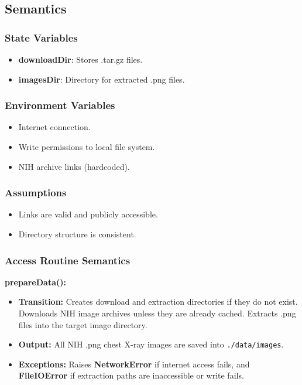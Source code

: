\documentclass[12pt, titlepage]{article}
\begin{document}
\subsection{Semantics}

\subsubsection{State Variables}
\begin{itemize}
    \item \textbf{downloadDir}: Stores .tar.gz files.
    \item \textbf{imagesDir}: Directory for extracted .png files.
\end{itemize}

\subsubsection{Environment Variables}
\begin{itemize}
    \item Internet connection.
    \item Write permissions to local file system.
    \item NIH archive links (hardcoded).
\end{itemize}

\subsubsection{Assumptions}
\begin{itemize}
    \item Links are valid and publicly accessible.
    \item Directory structure is consistent.
\end{itemize}

\subsubsection{Access Routine Semantics}

\textbf{prepareData():}
\begin{itemize}
    \item \textbf{Transition:} Creates download and extraction directories if they do not exist. Downloads NIH image archives unless they are already cached. Extracts .png files into the target image directory.
    \item \textbf{Output:} All NIH .png chest X-ray images are saved into \texttt{./data/images}.
    \item \textbf{Exceptions:} Raises \textbf{NetworkError} if internet access fails, and \textbf{FileIOError} if extraction paths are inaccessible or write fails.
\end{itemize}
\newpage
\end{document}
